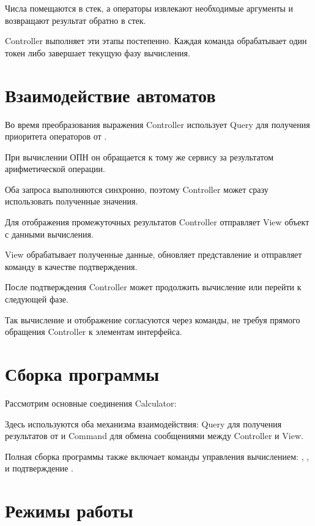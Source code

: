 Числа помещаются в стек, а операторы извлекают
необходимые аргументы и возвращают результат
обратно в стек.

Controller выполняет эти этапы постепенно.
Каждая команда  обрабатывает один токен
либо завершает текущую фазу вычисления.

\section{Взаимодействие автоматов}

Во время преобразования выражения Controller
использует Query для получения приоритета операторов
от .

При вычислении ОПН он обращается к тому же сервису
за результатом арифметической операции.

Оба запроса выполняются синхронно, поэтому Controller
может сразу использовать полученные значения.

Для отображения промежуточных результатов
Controller отправляет View объект
 с данными вычисления.

View обрабатывает полученные данные, обновляет
представление и отправляет команду
 в качестве подтверждения.

После подтверждения Controller может продолжить
вычисление или перейти к следующей фазе.

Так вычисление и отображение согласуются через
команды, не требуя прямого обращения Controller
к элементам интерфейса.

\section{Сборка программы}

Рассмотрим основные соединения Calculator:



Здесь используются оба механизма взаимодействия:
Query для получения результатов от
 и Command для обмена
сообщениями между Controller и View.

Полная сборка программы также включает команды
управления вычислением: ,
,  и подтверждение
.

\section{Режимы работы}


